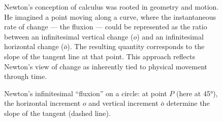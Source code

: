 \begin{figure}[H]
\centering
{}

\vspace{0.5em}
\caption{\small Newton's conception of calculus was rooted in geometry and motion. He imagined a point moving along a curve, where the instantaneous rate of change — the fluxion — could be represented as the ratio between an infinitesimal vertical change ($o$) and an infinitesimal horizontal change ($\bar{o}$). The resulting quantity corresponds to the slope of the tangent line at that point. This approach reflects Newton’s view of change as inherently tied to physical movement through time.}
\end{figure}



\begin{figure}[H]
  \centering
  
  \vspace{0.5em}
  \caption{\small Newton’s infinitesimal “fluxion” on a circle: at point $P$ (here at 45°), the horizontal increment $o$ and vertical increment $\bar{o}$ determine the slope of the tangent (dashed line).}
\end{figure}

